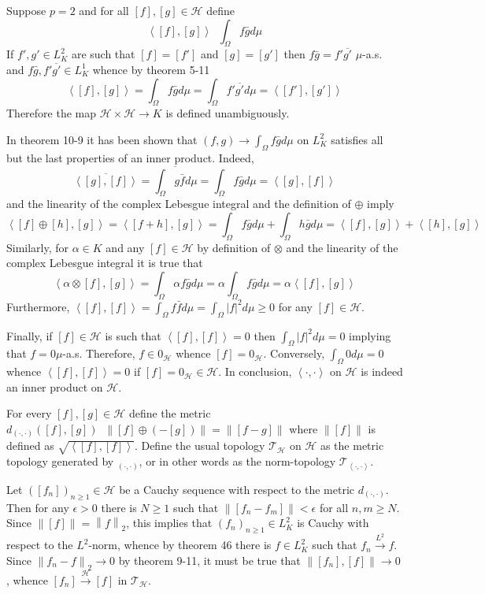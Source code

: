 \documentclass[a4paper]{article}
\newcommand{\clo}[1]{\left [ #1 \right ]}
\newcommand{\brac}[1]{\left ( #1 \right )}
\newcommand{\abs}[1]{\left | #1 \right |}
\newcommand{\nrm}[1]{\left\| #1 \right \|}
\newcommand{\brkt}[1]{\left\langle #1 \right\rangle}
\newcommand{\Tcal}{\mathcal{T}}
\newcommand{\Hcal}{\mathcal{H}}
\newcommand{\defn}{\mathop{\overset{\Delta}{=}}\nolimits}
\begin{document}
Suppose $p=2$ and for all $\clo{f}, \clo{g}\in \Hcal$ define\[\brkt{\clo{f},\clo{g}}\defn \int_\Omega f\bar{g} d\mu\] If $f',g'\in L^2_K$ are such that $\clo{f}=\clo{f'}$ and $\clo{g}=\clo{g'}$ then $f\bar{g} = f'\overline{g'}$ $\mu$-a.s. and $f\bar{g}, f'\overline{g'}\in L^1_K$ whence by theorem 5-11 \[\brkt{\clo{f},\clo{g}} = \int_\Omega f\bar{g} d\mu = \int_\Omega f'\overline{g'} d\mu = \brkt{\clo{f'},\clo{g'}}\] Therefore the map $\Hcal\times\Hcal\to K$ is defined unambiguously.

In theorem 10-9 it has been shown that $\brac{f,g}\to \int_\Omega f\bar{g} d\mu$ on $L^2_K$ satisfies all but the last properties of an inner product. Indeed, \[\overline{\brkt{\clo{g}, \clo{f}}} = \overline{\int_\Omega g\bar{f} d\mu} = \int_\Omega f\bar{g} d\mu = \brkt{\clo{g}, \clo{f}}\] and the linearity of the complex Lebesgue integral and the definition of $\oplus$ imply \[\brkt{\clo{f}\oplus\clo{h},\clo{g}} = \brkt{\clo{f+h}, \clo{g}} = \int_\Omega f\bar{g} d\mu + \int_\Omega h\bar{g} d\mu = \brkt{\clo{f}, \clo{g}} + \brkt{\clo{h}, \clo{g}}\] Similarly, for $\alpha\in K$ and any $\clo{f}\in \Hcal$ by definition of $\otimes$ and the linearity of the complex Lebesgue integral it is true that \[\brkt{\alpha\otimes\clo{f}, \clo{g}}=\int_\Omega \alpha f \bar{g}d\mu = \alpha \int_\Omega f \bar{g}d\mu = \alpha \brkt{\clo{f}, \clo{g}}\] Furthermore, $\brkt{\clo{f},\clo{f}} = \int_\Omega f\bar{f} d\mu = \int_\Omega \abs{f}^2 d\mu\geq 0$ for any $\clo{f}\in \Hcal$.

Finally, if $\clo{f}\in \Hcal$ is such that $\brkt{\clo{f},\clo{f}} = 0$ then $\int_\Omega \abs{f}^2 d\mu=0$ implying that $f=0$$\mu$-a.s. Therefore, $f\in 0_\Hcal$ whence $\clo{f}=0_\Hcal$. Conversely, $\int_\Omega 0 d\mu = 0$ whence $\brkt{\clo{f}, \clo{f}} = 0$ if $\clo{f}=0_\Hcal\in \Hcal$. In conclusion, $\brkt{\cdot, \cdot}$ on $\Hcal$ is indeed an inner product on $\Hcal$.

For every $\clo{f}, \clo{g}\in \Hcal$ define the metric $d_{\brac{\cdot,\cdot}}\brac{\clo{f}, \clo{g}}\defn \nrm{\clo{f}\oplus\brac{-\clo{g}}}=\nrm{\clo{f-g}}$ where $\nrm{\clo{f}}$ is defined as $\sqrt{\brkt{\clo{f}, \clo{f}}}$. Define the usual topology $\Tcal_\Hcal$ on $\Hcal$ as the metric topology generated by $_{\brac{\cdot,\cdot}}$, or in other words as the norm-topology $\Tcal_{\brkt{\cdot,\cdot}}$.

Let $\brac{\clo{f_n}}_{n\geq 1}\in \Hcal$ be a Cauchy sequence with respect to the metric $d_{\brac{\cdot,\cdot}}$. Then for any $\epsilon>0$ there is $N\geq 1$ such that $\nrm{\clo{f_n-f_m}}<\epsilon$ for all $n,m\geq N$. Since $\nrm{\clo{f}}=\nrm{f}_2$, this implies that $\brac{f_n}_{n\geq 1}\in L^2_K$ is Cauchy with respect to the $L^2$-norm, whence by theorem 46 there is $f\in L^2_K$ such that $f_n\overset{L^2}{\to}f$. Since $\nrm{f_n-f}_2\to 0$ by theorem 9-11, it must be true that $\nrm{\clo{f_n},\clo{f}}\to 0$, whence $\clo{f_n}\overset{\Hcal}{\to}\clo{f}$ in $\Tcal_\Hcal$.
\end{document}
